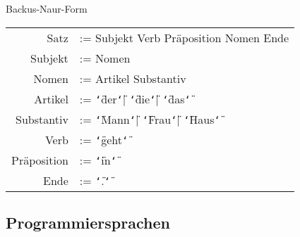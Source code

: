 \documentclass[german]{../spicker}
\newenvironment{allintypewriter}{\ttfamily}{\par}
\newcommand*{\ditto}{\texttt{\char`\"}}
\begin{document}
\begin{example}{Backus-Naur-Form}
    \begin{allintypewriter}
        \begin{tabular}{rl}
            Satz        & := Subjekt Verb Präposition Nomen Ende                       \\
            Subjekt     & := Nomen                                                     \\
            Nomen       & := Artikel Substantiv                                        \\
            Artikel     & := \ditto der\ditto | \ditto die\ditto | \ditto das\ditto    \\
            Substantiv  & := \ditto Mann\ditto | \ditto Frau\ditto | \ditto Haus\ditto \\
            Verb        & := \ditto geht\ditto                                         \\
            Präposition & := \ditto in\ditto                                           \\
            Ende        & := \ditto .\ditto
        \end{tabular}
    \end{allintypewriter}
\end{example}

\subsection{Programmiersprachen}
\end{document}
